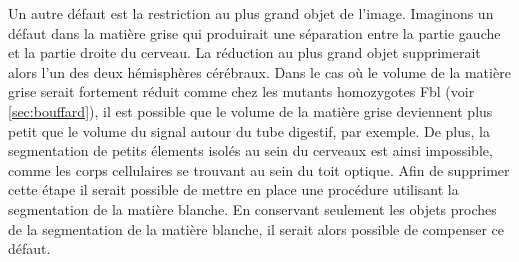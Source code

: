 \documentclass[\main/main.tex]{subfiles}
\begin{document}
%
Un autre défaut est la restriction au plus grand objet de l'image.
%
Imaginons un défaut dans la matière grise qui produirait une séparation entre la partie gauche et la partie droite du cerveau.
%
La réduction au plus grand objet supprimerait alors l'un des deux hémisphères cérébraux.
%
Dans le cas où le volume de la matière grise serait fortement réduit comme chez les mutants homozygotes Fbl (voir \ref{sec:bouffard}),
il est possible que le volume de la matière grise deviennent plus petit que le volume du signal autour du tube digestif, par exemple.
%
De plus, la segmentation de petits élements isolés au sein du cerveaux est ainsi impossible, comme les corps cellulaires se trouvant au sein du toit optique.
%
Afin de supprimer cette étape il serait possible de mettre en place une procédure utilisant la segmentation de la matière blanche.
%
En conservant seulement les objets proches de la segmentation de la matière blanche, il serait alors possible de compenser ce défaut.
\end{document}

